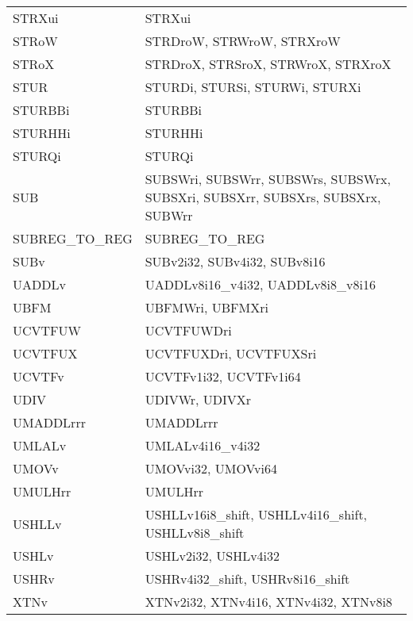\begin{xltabular}{\textwidth}{lX}
    STRXui & STRXui \\
    STRoW & STRDroW, STRWroW, STRXroW \\
    STRoX & STRDroX, STRSroX, STRWroX, STRXroX \\
    STUR & STURDi, STURSi, STURWi, STURXi \\
    STURBBi & STURBBi \\
    STURHHi & STURHHi \\
    STURQi & STURQi \\
    SUB & SUBSWri, SUBSWrr, SUBSWrs, SUBSWrx, SUBSXri, SUBSXrr, SUBSXrs, SUBSXrx, SUBWrr \\
    SUBREG\_TO\_REG & SUBREG\_TO\_REG \\
    SUBv & SUBv2i32, SUBv4i32, SUBv8i16 \\
    UADDLv & UADDLv8i16\_v4i32, UADDLv8i8\_v8i16 \\
    UBFM & UBFMWri, UBFMXri \\
    UCVTFUW & UCVTFUWDri \\
    UCVTFUX & UCVTFUXDri, UCVTFUXSri \\
    UCVTFv & UCVTFv1i32, UCVTFv1i64 \\
    UDIV & UDIVWr, UDIVXr \\
    UMADDLrrr & UMADDLrrr \\
    UMLALv & UMLALv4i16\_v4i32 \\
    UMOVv & UMOVvi32, UMOVvi64 \\
    UMULHrr & UMULHrr \\
    USHLLv & USHLLv16i8\_shift, USHLLv4i16\_shift, USHLLv8i8\_shift \\
    USHLv & USHLv2i32, USHLv4i32 \\
    USHRv & USHRv4i32\_shift, USHRv8i16\_shift \\
    XTNv & XTNv2i32, XTNv4i16, XTNv4i32, XTNv8i8 \\
\end{xltabular}

\newpage
